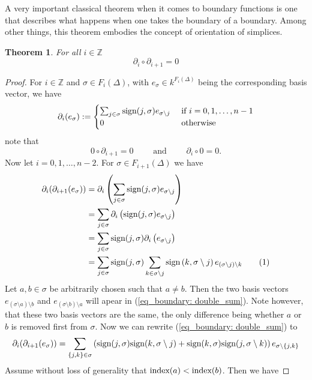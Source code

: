 \documentclass[11pt,a4paper,twoside]{report}
\newtheorem{mythm}{Theorem}[chapter]
\newcommand\numberthis{\addtocounter{equation}{1}\tag{\theequation}}
\begin{document}
A very important classical theorem when it comes to boundary functions is one that describes what happens when one takes the boundary of a boundary. Among other things, this theorem embodies the concept of orientation of simplices.
\begin{mythm}\label{thm:boundary}
For all $i\in\mathbb{Z}$ 
\begin{equation*}
\partial_i\circ\partial_{i+1}=0
\end{equation*}
\end{mythm}
\begin{proof}
For $i\in\mathbb{Z}$ and $\sigma\in F_i(\Delta)$, with $e_\sigma\in k^{F_i(\Delta)}$ being the corresponding basis vector, we have 
\begin{equation*}
\partial_i(e_\sigma):=
\begin{cases}
\sum_{j\in\sigma}\textnormal{sign}(j,\sigma)e_{\sigma\setminus j} & \textnormal{ if } i=0,1,\dots,n-1 \\
0 & \textnormal{ otherwise}
\end{cases}
\end{equation*}
note that 
\begin{equation*}
0\circ\partial_{i+1}=0 \qquad \text{ and } \qquad \partial_i\circ 0 = 0.
\end{equation*}
Now let $i=0,1,\dots,n-2$. For $\sigma\in F_{i+1}(\Delta)$ we have
\begin{align*}
\partial_i(\partial_{i+1}(e_\sigma))&=\partial_i\left(\sum_{j\in\sigma}\textnormal{sign}(j,\sigma)e_{\sigma\setminus j}\right) \\
&=\sum_{j\in\sigma}\partial_i\left(\textnormal{sign}(j,\sigma)e_{\sigma\setminus j}\right)\\
&=\sum_{j\in\sigma}\textnormal{sign}(j,\sigma)\partial_i\left(e_{\sigma\setminus j}\right)\\
&=\sum_{j\in\sigma}\textnormal{sign}(j,\sigma)\sum_{k\in\sigma\setminus j}\textnormal{sign}\left(k,\sigma\setminus j\right)e_{(\sigma\setminus j)\setminus k}\numberthis \label{eq_boundary: double_sum}\\
\end{align*}
Let $a,b\in\sigma$ be arbitrarily chosen such that $a\not=b$. Then the two basis vectors $e_{(\sigma\setminus a)\setminus b}$ and $e_{(\sigma\setminus b)\setminus a}$ will apear in (\ref{eq_boundary: double_sum}). Note however, that these two basis vectors are the same, the only difference being whether $a$ or $b$ is removed first from $\sigma$. Now we can rewrite (\ref{eq_boundary: double_sum}) to
\begin{equation}
\partial_i(\partial_{i+1}(e_\sigma))=\sum_{\{j,k\}\in\sigma}\left(\textnormal{sign}(j,\sigma)\textnormal{sign}(k,\sigma\setminus j) + \textnormal{sign}(k,\sigma)\textnormal{sign}(j,\sigma\setminus k)\right)e_{\sigma\setminus\{j,k\}} \label{eq_boundary: 0}
\end{equation}
Assume without loss of generality that $\textnormal{index}(a)<\textnormal{index}(b)$. Then we have 


\end{proof}
\end{document}
